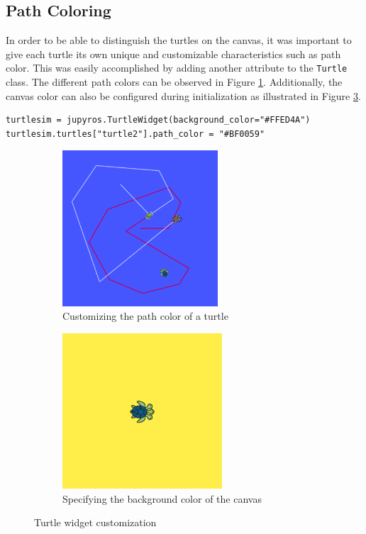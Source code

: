     
    \subsection{Path Coloring}
        
        In order to be able to distinguish the turtles on the canvas, it was important to give each turtle its own unique and customizable characteristics such as path color. This was easily accomplished by adding another attribute to the \texttt{Turtle} class. The different path colors can be observed in Figure \ref{fig:pathColor}. Additionally, the canvas color can also be configured during initialization as illustrated in Figure \ref{fig:background}.
        
        \begin{lstlisting}
turtlesim = jupyros.TurtleWidget(background_color="#FFED4A")
turtlesim.turtles["turtle2"].path_color = "#BF0059"
        \end{lstlisting}
        
        
        
    \begin{figure}[hb]
            \centering
            \begin{subfigure}{.5\textwidth}
                \centering
                \includegraphics[height=5.8cm]{Images/03_pathColor.png}
                \caption{Customizing the path color of a turtle}
                \label{fig:pathColor}
            \end{subfigure}%
            \begin{subfigure}{.5\textwidth}
                \centering
                \includegraphics[height=5.8cm]{Images/03_backgroundColor.png}
                \caption{Specifying the background color of the canvas}
                \label{fig:background}
            \end{subfigure}
            \caption{Turtle widget customization}
    \end{figure}
    
